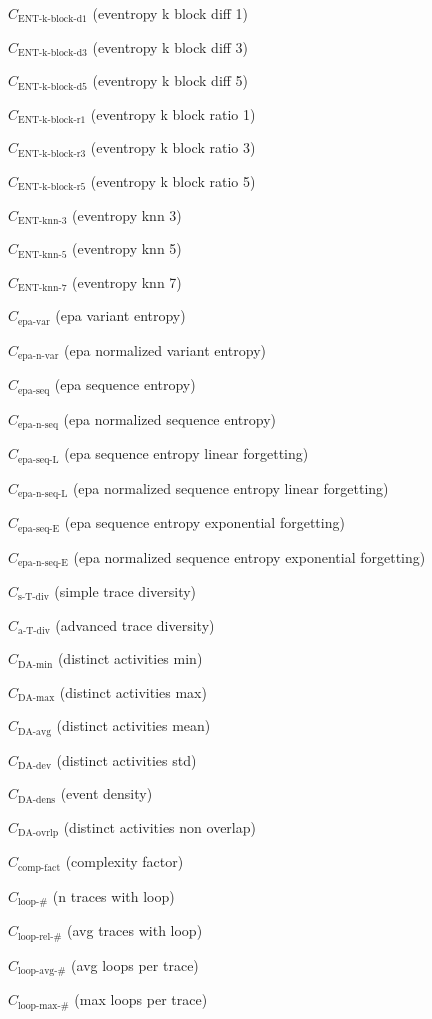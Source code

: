 \documentclass[a4paper]{article}
\newcommand{\daminname}{\text{DA-min}}
\newcommand{\damin}{C_{\daminname}}
\newcommand{\daavgname}{\text{DA-avg}}
\newcommand{\daavg}{C_{\daavgname}}
\newcommand{\damaxname}{\text{DA-max}}
\newcommand{\damax}{C_{\damaxname}}
\newcommand{\dadevname}{\text{DA-dev}}
\newcommand{\dadev}{C_{\dadevname}}
\newcommand{\dadensname}{\text{DA-dens}}
\newcommand{\dadens}{C_{\dadensname}}
\newcommand{\daoverlapname}{\text{DA-ovrlp}}
\newcommand{\daoverlap}{C_{\daoverlapname}}
\newcommand{\complexityfactorname}{\text{comp-fact}}
\newcommand{\complexityfactor}{C_{\complexityfactorname}}
\newcommand{\simpletracedivname}{\text{s-T-div}}
\newcommand{\simpletracediv}{C_{\simpletracedivname}}
\newcommand{\advtracedivname}{\text{a-T-div}}
\newcommand{\advtracediv}{C_{\advtracedivname}}
\newcommand{\loopnumname}{\text{loop-\#}}
\newcommand{\loopnum}{C_{\loopnumname}}
\newcommand{\looprelnumname}{\text{loop-rel-\#}}
\newcommand{\looprelnum}{C_{\looprelnumname}}
\newcommand{\loopavgname}{\text{loop-avg-\#}}
\newcommand{\loopavg}{C_{\loopavgname}}
\newcommand{\loopmaxname}{\text{loop-max-\#}}
\newcommand{\loopmax}{C_{\loopmaxname}}
\newcommand{\entkblockdonename}{\text{ENT-k-block-d1}}
\newcommand{\entkblockdone}{C_{\entkblockdonename}}
\newcommand{\entkblockdthreename}{\text{ENT-k-block-d3}}
\newcommand{\entkblockdthree}{C_{\entkblockdthreename}}
\newcommand{\entkblockdfivename}{\text{ENT-k-block-d5}}
\newcommand{\entkblockdfive}{C_{\entkblockdfivename}}
\newcommand{\entkblockronename}{\text{ENT-k-block-r1}}
\newcommand{\entkblockrone}{C_{\entkblockronename}}
\newcommand{\entkblockrthreename}{\text{ENT-k-block-r3}}
\newcommand{\entkblockrthree}{C_{\entkblockrthreename}}
\newcommand{\entkblockrfivename}{\text{ENT-k-block-r5}}
\newcommand{\entkblockrfive}{C_{\entkblockrfivename}}
\newcommand{\entknnthreename}{\text{ENT-knn-3}}
\newcommand{\entknnthree}{C_{\entknnthreename}}
\newcommand{\entknnfivename}{\text{ENT-knn-5}}
\newcommand{\entknnfive}{C_{\entknnfivename}}
\newcommand{\entknnsevenname}{\text{ENT-knn-7}}
\newcommand{\entknnseven}{C_{\entknnsevenname}}
\newcommand{\epavariantname}{\text{epa-var}}
\newcommand{\epavariant}{C_{\epavariantname}}
\newcommand{\epanormvariantname}{\text{epa-n-var}}
\newcommand{\epanormvariant}{C_{\epanormvariantname}}
\newcommand{\epasequencename}{\text{epa-seq}}
\newcommand{\epasequence}{C_{\epasequencename}}
\newcommand{\epanormsequencename}{\text{epa-n-seq}}
\newcommand{\epanormsequence}{C_{\epanormsequencename}}
\newcommand{\epasequencelname}{\text{epa-seq-L}}
\newcommand{\epasequencel}{C_{\epasequencelname}}
\newcommand{\epanormsequencelname}{\text{epa-n-seq-L}}
\newcommand{\epanormsequencel}{C_{\epanormsequencelname}}
\newcommand{\epasequenceename}{\text{epa-seq-E}}
\newcommand{\epasequencee}{C_{\epasequenceename}}
\newcommand{\epanormsequenceename}{\text{epa-n-seq-E}}
\newcommand{\epanormsequencee}{C_{\epanormsequenceename}}
\begin{document}
\begin{compactenum}
\item $\entkblockdone$ (eventropy k block diff 1)
\item $\entkblockdthree$ (eventropy k block diff 3)
\item $\entkblockdfive$ (eventropy k block diff 5)
\item $\entkblockrone$ (eventropy k block ratio 1)
\item $\entkblockrthree$ (eventropy k block ratio 3)
\item $\entkblockrfive$ (eventropy k block ratio 5)
\item $\entknnthree$ (eventropy knn 3)
\item $\entknnfive$ (eventropy knn 5)
\item $\entknnseven$ (eventropy knn 7)
\item $\epavariant$ (epa variant entropy)
\item $\epanormvariant$ (epa normalized variant entropy)
\item $\epasequence$ (epa sequence entropy)
\item $\epanormsequence$ (epa normalized sequence entropy)
\item $\epasequencel$ (epa sequence entropy linear forgetting)
\item $\epanormsequencel$ (epa normalized sequence entropy linear forgetting)
\item $\epasequencee$ (epa sequence entropy exponential forgetting)
\item $\epanormsequencee$ (epa normalized sequence entropy exponential forgetting)
\item $\simpletracediv$ (simple trace diversity)
\item $\advtracediv$ (advanced trace diversity)
\item $\damin$ (distinct activities min)
\item $\damax$ (distinct activities max)
\item $\daavg$ (distinct activities mean)
\item $\dadev$ (distinct activities std)
\item $\dadens$ (event density)
\item $\daoverlap$ (distinct activities non overlap)
\item $\complexityfactor$ (complexity factor)
\item $\loopnum$ (n traces with loop)
\item $\looprelnum$ (avg traces with loop)
\item $\loopavg$ (avg loops per trace)
\item $\loopmax$ (max loops per trace)

\end{compactenum}
\end{document}
